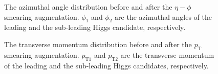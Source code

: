 \documentclass[12pt]{article}
\begin{document}
		\begin{figure}[htpb]
			\centering
			\caption{The azimuthal angle distribution before and after the $\eta-\phi$ smearing augmentation. $\phi_1$ and $\phi_2$ are the azimuthal angles of the leading and the sub-leading Higgs candidate, respectively.}
			\label{fig:eta_phi_smearing_phi_distribution}
		\end{figure}
		\begin{figure}[htpb]
			\centering
			\caption{The transverse momentum distribution before and after the $p_{\text{T}}$ smearing augmentation. $p_{\text{T1}}$ and $p_{\text{T2}}$ are the transverse momentum of the leading and the sub-leading Higgs candidates, respectively.}
			\label{fig:pt_smearing_pt_distribution}
		\end{figure}
\end{document}
